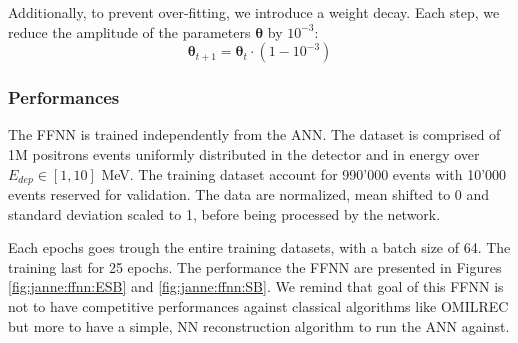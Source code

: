 \documentclass[../main.tex]{subfiles}
\begin{document}
Additionally, to prevent over-fitting, we introduce a weight decay. Each step, we reduce the amplitude of the parameters $\bm{\theta}$ by $10^{-3}$:
\begin{equation}
  \bm{\theta}_{t+1} = \bm{\theta}_t \cdot (1 - 10^{-3})
\end{equation}

\subsubsection{Performances}

The FFNN is trained independently from the ANN. The dataset is comprised of 1M positrons events uniformly distributed in the detector and in energy over $E_{dep} \in [1, 10]$ MeV. The training dataset account for 990'000 events with 10'000 events reserved for validation. The data are normalized, mean shifted to 0 and standard deviation scaled to 1, before being processed by the network.

Each epochs goes trough the entire training datasets, with a batch size of 64. The training last for 25 epochs. The performance the FFNN are presented in Figures \ref{fig:janne:ffnn:ESB} and \ref{fig:janne:ffnn:SB}. We remind that goal of this FFNN is not to have competitive performances against classical algorithms like OMILREC but more to have a simple, NN reconstruction algorithm to run the ANN against.
\end{document}
